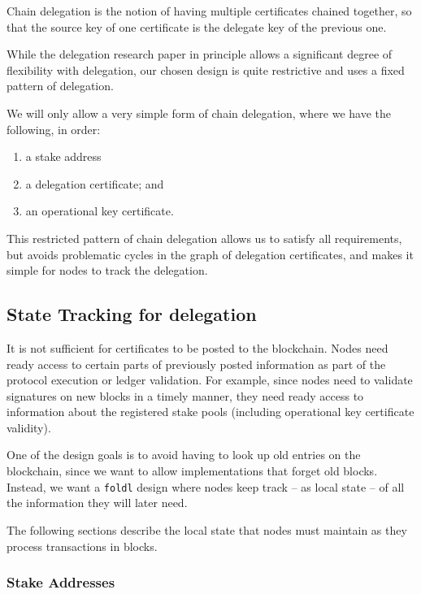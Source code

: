 \documentclass[11pt,a4paper,dvipsnames,twosided]{article}
\begin{document}
Chain delegation is the notion of having multiple certificates chained
together, so that the source key of one certificate is the delegate key
of the previous one.

While the delegation research paper in principle allows a significant
degree of flexibility with delegation, our chosen design is quite
restrictive and uses a fixed pattern of delegation.

We will only allow a very simple form of chain delegation, where we have
the following, in order:

\begin{enumerate}
\item
  a stake address
\item
  a delegation certificate; and
\item
  an operational key certificate.
\end{enumerate}

This restricted pattern of chain delegation allows us to satisfy all
requirements, but avoids problematic cycles in the graph of delegation
certificates, and makes it simple for nodes to track the delegation.

\subsection{State Tracking for delegation}
\label{state-tracking-for-delegation}

It is not sufficient for certificates to be posted to the blockchain.
Nodes need ready access to certain parts of previously posted
information as part of the protocol execution or ledger validation. For
example, since nodes need to validate signatures on new blocks in a
timely manner, they need ready access to information about the registered
stake pools (including operational key certificate validity).

One of the design goals is to avoid having to look up old entries on the
blockchain, since we want to allow implementations that forget old
blocks. Instead, we want a {\tt foldl} design where nodes keep track -- as
local state -- of all the information they will later need.

The following sections describe the local state that nodes must maintain
as they process transactions in blocks.

\subsubsection{Stake Addresses}
\label{stake-addresses}
\end{document}
